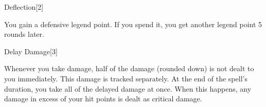 \begin{spellsection}{Deflection}[2]
    \begin{spellheader}
    \end{spellheader}
    \begin{spellcontent}
        \begin{spelltargetinginfo}
        \end{spelltargetinginfo}
        \begin{spelleffects}
            \spelleffect You gain a defensive legend point. If you spend it, you get another legend point 5 rounds later.
            \spelldur \durlong
        \end{spelleffects}
    \end{spellcontent}
    \begin{spellfooter}
        \miscastexplode
    \end{spellfooter}
\end{spellsection}

\begin{spellsection}{Delay Damage}[3]
    \begin{spellheader}
    \end{spellheader}
    \begin{spellcontent}
        \begin{spelltargetinginfo}
        \end{spelltargetinginfo}
        \begin{spelleffects}
            \spelleffect Whenever you take damage, half of the damage (rounded down) is not dealt to you immediately. This damage is tracked separately. At the end of the spell's duration, you take all of the delayed damage at once. When this happens, any damage in excess of your hit points is dealt as critical damage.
            \spelldur \durmed
        \end{spelleffects}
        \begin{spellfooter}
            \miscastexplode
        \end{spellfooter}
    \end{spellcontent}
\end{spellsection}

